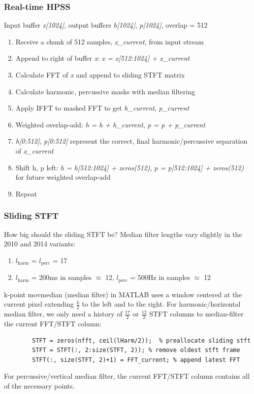 \documentclass{beamer}
\begin{document}
\begin{frame}
	\frametitle{Real-time HPSS}
	Input buffer \textit{x[1024]}, output buffers \textit{h[1024]}, \textit{p[1024]}, overlap = 512
	\begin{enumerate}
		\item Receive a chunk of 512 samples, \textit{x\_current}, from input stream
		\item Append to right of buffer \textit{x}: \textit{x = x[512:1024] + x\_current}
		\item Calculate FFT of \textit{x} and append to sliding STFT matrix
		\item Calculate harmonic, percussive masks with median filtering
		\item Apply IFFT to masked FFT to get \textit{h\_current}, \textit{p\_current}
		\item Weighted overlap-add: \textit{h = h + h\_current}, \textit{p = p + p\_current}
		\item \textit{h[0:512]}, \textit{p[0:512]} represent the correct, final harmonic/percussive separation of \textit{x\_current}
		\item Shift h, p left: \textit{h = h[512:1024] + zeros(512)}, \textit{p = p[512:1024] + zeros(512)} for future weighted overlap-add
		\item Repeat
	\end{enumerate}
\end{frame}

\begin{frame}[fragile]
	\frametitle{Sliding STFT}
	How big should the sliding STFT be? Median filter lengths vary slightly in the 2010 and 2014 variants:
	\begin{enumerate}
		\item $l_{\text{harm}}$ = $l_{\text{perc}}$ = 17
		\item $l_{\text{harm}}$ = 200ms in samples $\approx$ 12, $l_{\text{perc}}$ = 500Hz in samples $\approx$ 12
	\end{enumerate}
	k-point movmedian (median filter) in MATLAB  uses a window centered at the current pixel extending $\frac{k}{2}$ to the left and to the right. For harmonic/horizontal median filter, we only need a history of $\frac{17}{2}$ or $\frac{12}{2}$ STFT columns to median-filter the current FFT/STFT column:
	\begin{small}
	\begin{verbatim}
	    STFT = zeros(nfft, ceil(lHarm/2));  % preallocate sliding stft
	    STFT = STFT(:, 2:size(STFT, 2)); % remove oldest stft frame 
	    STFT(:, size(STFT, 2)+1) = FFT_current; % append latest FFT
	\end{verbatim}
	\end{small}
	For percussive/vertical median filter, the current FFT/STFT column contains all of the necessary points.
\end{frame}
\end{document}
